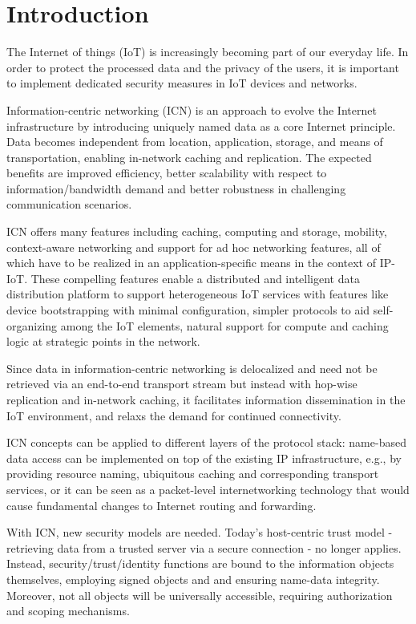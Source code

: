 \section{Introduction}

The Internet of things (IoT) is increasingly becoming part of our
everyday life. In order to protect the processed data and the privacy of the users, it is important to implement dedicated security measures in IoT devices and networks. \par
Information-centric networking (ICN) is an approach to evolve the Internet infrastructure by introducing uniquely named data as a core Internet principle. Data becomes independent from location, application, storage, and means of transportation, enabling in-network caching and replication. The expected benefits are improved efficiency, better scalability with respect to information/bandwidth demand and better robustness in challenging communication scenarios.\par
ICN offers many features including caching, computing and storage, mobility, context-aware networking and support for ad hoc networking features, all of which have to be realized in an application-specific means in the context of IP-IoT. These compelling features enable a distributed and intelligent data distribution platform to support heterogeneous IoT services with features like device bootstrapping with minimal configuration, simpler protocols to aid self-organizing among the IoT elements, natural support for compute and caching logic at strategic points in the network.\par
Since data in information-centric networking is delocalized and
need not be retrieved via an end-to-end transport stream but
instead with hop-wise replication and in-network caching, it facilitates information dissemination in the IoT environment, and relaxs the demand for continued connectivity.\par
ICN concepts can be applied to different layers of the protocol stack: name-based data access can be implemented on top of the existing IP infrastructure, e.g., by providing resource naming, ubiquitous caching and corresponding transport services, or it can be seen as a packet-level internetworking technology that would cause fundamental changes to Internet routing and forwarding.\par
With ICN, new security models are needed. Today’s host-centric trust model - retrieving data from a trusted server via a secure connection - no longer applies. Instead, security/trust/identity functions are bound to the information objects themselves, employing signed objects and and ensuring name-data integrity. Moreover, not all objects will be universally accessible, requiring authorization and scoping mechanisms.\par
